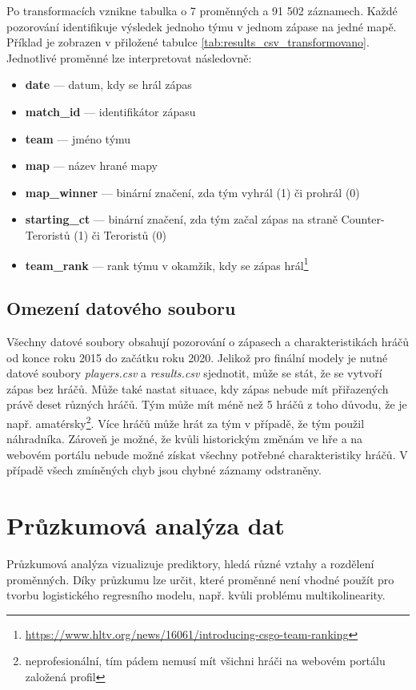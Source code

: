 Po transformacích vznikne tabulka o 7 proměnných a 91 502 záznamech. Každé pozorování identifikuje výsledek jednoho týmu v jednom zápase
na jedné mapě. Příklad je zobrazen v přiložené tabulce \ref{tab:results_csv_transformovano}. Jednotlivé proměnné lze interpretovat následovně:
\begin{itemize}
    \item \textbf{date} --- datum, kdy se hrál zápas
    \item \textbf{match\_id} --- identifikátor zápasu
    \item \textbf{team} --- jméno týmu
    \item \textbf{map} --- název hrané mapy
    \item \textbf{map\_winner} --- binární značení, zda tým vyhrál (1) či prohrál (0)
    \item \textbf{starting\_ct} --- binární značení, zda tým začal zápas na straně Counter-Teroristů (1) či Teroristů (0)
    \item \textbf{team\_rank} --- rank týmu v okamžik, kdy se zápas hrál\footnote{\url{https://www.hltv.org/news/16061/introducing-csgo-team-ranking}}
\end{itemize}

\subsection{Omezení datového souboru}
{\color{red}
Všechny datové soubory obsahují pozorování o zápasech a charakteristikách hráčů od konce roku 2015 do začátku roku 2020. Jelikož pro finální modely je nutné datové soubory
\textit{players.csv} a \textit{results.csv} sjednotit, může se stát, že se vytvoří zápas bez hráčů. Může také nastat situace, kdy zápas nebude mít přiřazených právě 
deset různých hráčů. Tým může mít méně než 5 hráčů z toho důvodu, že je např.
amatérsky\footnote{neprofesionální, tím pádem nemusí mít všichni hráči na webovém portálu založená profil}. Více hráčů může hrát za tým v případě, že tým použil náhradníka.
Zároveň je možné, že kvůli historickým změnám ve hře a na webovém portálu nebude možné získat všechny potřebné charakteristiky hráčů. V případě všech zmíněných chyb jsou
chybné záznamy odstraněny.
}

\section{Průzkumová analýza dat}
Průzkumová analýza vizualizuje prediktory, hledá různé vztahy a rozdělení proměnných. Díky průzkumu lze určit, které proměnné není vhodné použít pro tvorbu
logistického regresního modelu, např. kvůli problému multikolinearity.

